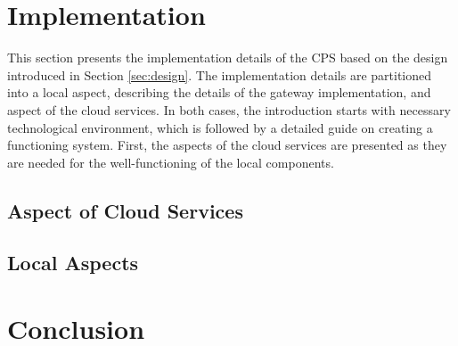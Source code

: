 \documentclass[a4paper, 11pt]{article}
\begin{document}
	\section{Implementation}
	\label{sec:implementation}
	This section presents the implementation details of the CPS based on the design introduced in Section \ref{sec:design}. The implementation details are partitioned into a local aspect, describing the details of the gateway implementation, and aspect of the cloud services. In both cases, the introduction starts with necessary technological environment, which is followed by a detailed guide on creating a functioning system. First, the aspects of the cloud services are presented as they are needed for the well-functioning of the local components.
	
	\subsection{Aspect of Cloud Services}
	
	\subsection{Local Aspects}
	
	\section{Conclusion}
	
\end{document}
